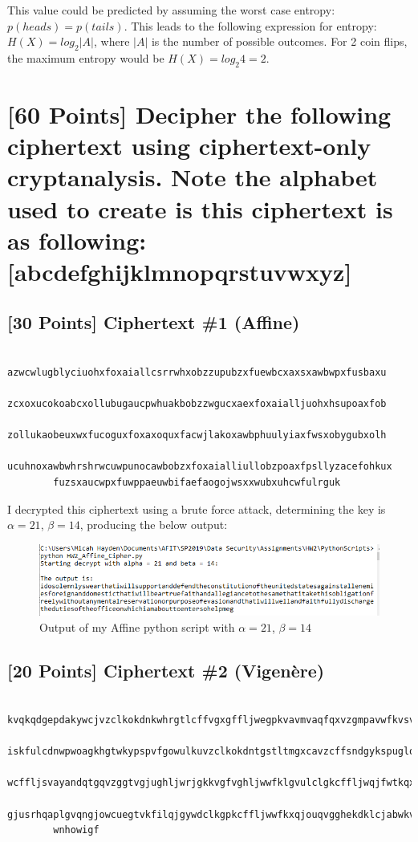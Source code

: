 \documentclass{article}
\begin{document}
\begin{enumerate}
This value could be predicted by assuming the worst case entropy:  $p(heads) = p(tails)$.
This leads to the following expression for entropy:  $H(X) = log_2|A|$, where $|A|$ is the number of possible outcomes.
For 2 coin flips, the maximum entropy would be $H(X) = log_2 4 = 2$.
    \end{enumerate}

    \section*{[60 Points] Decipher the following ciphertext using ciphertext-only cryptanalysis. Note the alphabet used to create is this ciphertext is as following: [abcdefghijklmnopqrstuvwxyz]}

    \subsection*{[30 Points] Ciphertext \#1 (Affine)}
    \begin{verbatim}
        azwcwlugblyciuohxfoxaiallcsrrwhxobzzupubzxfuewbcxaxsxawbwpxfusbaxu
        zcxoxucokoabcxollubugaucpwhuakbobzzwgucxaexfoxaialljuohxhsupoaxfob
        zollukaobeuxwxfucoguxfoxaxoquxfacwjlakoxawbphuulyiaxfwsxobygubxolh
        ucuhnoxawbwhrshrwcuwpunocawbobzxfoxaialliullobzpoaxfpsllyzacefohkux
        fuzsxaucwpxfuwppaeuwbifaefaogojwsxxwubxuhcwfulrguk
    \end{verbatim}

I decrypted this ciphertext using a brute force attack, determining the key is $\alpha = 21$, $\beta = 14$, producing the below output:

\begin{figure}[h!]
\centering
\includegraphics[scale=1.0]{Images/run_Affine.PNG}
\caption{Output of my Affine python script with $\alpha = 21$, $\beta = 14$}
\label{fig:affineOut}
\end{figure}

    \subsection*{[20 Points] Ciphertext \#2 (Vigen\`{e}re)}
    \begin{verbatim}
        kvqkqdgepdakywcjvzclkokdnkwhrgtlcffvgxgffljwegpkvavmvaqfqxvzgmpavwfkvsvwus
        iskfulcdnwpwoagkhgtwkypspvfgowulkuvzclkokdntgstltmgxcavzcffsndgykspuglqljwuso
        wcffljsvayandqtgqvzggtvgjughljwrjgkkvgfvghljwwfklgvulclgkcffljwqjfwtkqxvzgghxku
        gjusrhqaplgvqngjowcuegtvkfilqjgywdclkgpkcffljwwfkxqjouqvgghekdklcjabwkvaewugj
        wnhowigf
    \end{verbatim}
\end{document}
